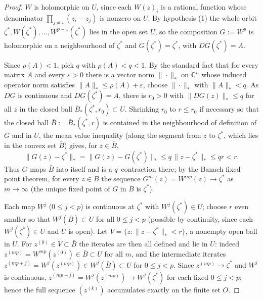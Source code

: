 \documentclass{amsart}
\theoremstyle{definition}
\theoremstyle{remark}
\newcommand{\C}{\mathbb{C}}
\begin{document}
\begin{proof}
$W$ is holomorphic on $U$, since each $W(z)_i$ is a rational function whose denominator
$\prod_{j\neq i}(z_i-z_j)$ is nonzero on $U$. By hypothesis (1) the whole orbit
$\zeta^{*},W(\zeta^{*}),\dots,W^{p-1}(\zeta^{*})$ lies in the open set $U$, so the
composition $G:=W^{p}$ is holomorphic on a neighbourhood of $\zeta^{*}$ and
$G(\zeta^{*})=\zeta^{*}$, with $DG(\zeta^{*})=A$.

Since $\rho(A)<1$, pick $q$ with $\rho(A)<q<1$. By the standard fact that for every matrix
$A$ and every $\varepsilon>0$ there is a vector norm $\|\cdot\|_{*}$ on $\C^n$ whose induced
operator norm satisfies $\|A\|_{*}\le\rho(A)+\varepsilon$, choose $\|\cdot\|_{*}$ with
$\|A\|_{*}<q$. As $DG$ is continuous and $DG(\zeta^{*})=A$, there is $r_0>0$ with
$\|DG(z)\|_{*}\le q$ for all $z$ in the closed ball $\bar B_{*}(\zeta^{*},r_0)\subset U$.
Shrinking $r_0$ to $r\le r_0$ if necessary so that the closed ball
$\bar B:=\bar B_{*}(\zeta^{*},r)$ is contained in the neighbourhood of definition of $G$ and
in $U$, the mean value inequality (along the segment from $z$ to $\zeta^{*}$, which lies in
the convex set $\bar B$) gives, for $z\in\bar B$,
\[
\|G(z)-\zeta^{*}\|_{*}=\|G(z)-G(\zeta^{*})\|_{*}\le q\,\|z-\zeta^{*}\|_{*}\le qr<r .
\]
Thus $G$ maps $\bar B$ into itself and is a $q$--contraction there; by the Banach fixed point
theorem, for every $z\in\bar B$ the sequence $G^{m}(z)=W^{mp}(z)\to\zeta^{*}$ as
$m\to\infty$ (the unique fixed point of $G$ in $\bar B$ is $\zeta^{*}$).

Each map $W^{j}$ ($0\le j<p$) is continuous at $\zeta^{*}$ with
$W^{j}(\zeta^{*})\in U$; choose $r$ even smaller so that $W^{j}(\bar B)\subset U$ for all
$0\le j<p$ (possible by continuity, since each $W^{j}(\zeta^{*})\in U$ and $U$ is open). Let
$V=\{z:\|z-\zeta^{*}\|_{*}<r\}$, a nonempty open ball in $U$. For $z^{(0)}\in V\subset\bar B$
the iterates are then all defined and lie in $U$: indeed $z^{(mp)}=W^{mp}(z^{(0)})\in\bar B
\subset U$ for all $m$, and the intermediate iterates $z^{(mp+j)}=W^{j}(z^{(mp)})\in
W^{j}(\bar B)\subset U$ for $0\le j<p$. Since $z^{(mp)}\to\zeta^{*}$ and $W^{j}$ is
continuous, $z^{(mp+j)}=W^{j}(z^{(mp)})\to W^{j}(\zeta^{*})$ for each fixed $0\le j<p$;
hence the full sequence $(z^{(k)})$ accumulates exactly on the finite set $O$.


\end{proof}
\end{document}
